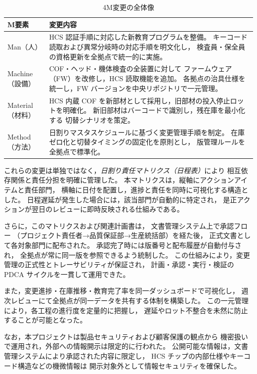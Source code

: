 \documentclass[journal,twocolumn]{IEEEtran}
\begin{document}
\begin{table}[t]
\caption{4M変更の全体像}
\label{tab:4m}
\centering
\begin{tabularx}{\columnwidth}{@{}l X@{}}
\toprule
M要素 & 変更内容 \\
\midrule
Man（人） &
HCS 認証手順に対応した新教育プログラムを整備。
キーコード読取および異常分岐時の対応手順を明文化し，
検査員・保全員の資格更新を全拠点で統一的に実施。 \\[2pt]

Machine（設備） &
COF・ヘッド・機体検査の全装置に対して
ファームウェア（FW）を改修し，HCS 読取機能を追加。
各拠点の治具仕様を統一し，FW バージョンを中央リポジトリで一元管理。 \\[2pt]

Material（材料） &
HCS 内蔵 COF を新部材として採用し，旧部材の投入停止ロットを明確化。
新旧部材はバーコードで識別し，残在庫を最小化する
切替シナリオを策定。 \\[2pt]

Method（方法） &
日割りマスタスケジュールに基づく変更管理手順を制定。
在庫ゼロ化と切替タイミングの固定化を原則とし，
版管理ルールを全拠点で標準化。 \\
\bottomrule
\end{tabularx}
\end{table}

これらの変更は単独ではなく，\emph{日割り責任マトリクス（日程表）}により
相互依存関係と責任分担を明確に管理した。
本マトリクスは，縦軸にアクションアイテムと責任部門，
横軸に日付を配置し，進捗と責任を同時に可視化する構造とした。
日程遅延が発生した場合には，該当部門が自動的に特定され，
是正アクションが翌日のレビューに即時反映される仕組みである。

さらに，このマトリクスおよび関連計画書は，
文書管理システム上で承認フロー
（プロジェクト責任者→品質保証部→生産統括部）を経た後，
正式文書として各対象部門に配布された。
承認完了時には版番号と配布履歴が自動付与され，
全拠点が常に同一版を参照できるよう統制した。
この仕組みにより，変更管理の正式性とトレーサビリティが保証され，
計画・承認・実行・検証の PDCA サイクルを一貫して運用できた。

また，変更進捗・在庫推移・教育完了率を同一ダッシュボードで可視化し，
週次レビューにて全拠点が同一データを共有する体制を構築した。
この一元管理により，各工程の進行度を定量的に把握し，
遅延やロット不整合を未然に防止することが可能となった。

なお，本プロジェクトは製品セキュリティおよび顧客保護の観点から
機密扱いで運用され，外部への情報開示は限定的に行われた。
公開可能な情報は，文書管理システムにより承認された内容に限定し，
HCS チップの内部仕様やキーコード構造などの機微情報は
開示対象外として情報セキュリティを確保した。
\end{document}
